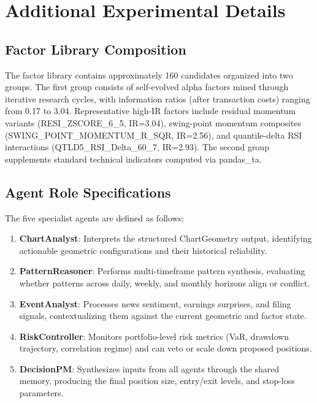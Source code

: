 \section{Additional Experimental Details}
\label{sec:appendix_details}

\subsection{Factor Library Composition}

The factor library contains approximately 160 candidates organized into two groups. The first group consists of self-evolved alpha factors mined through iterative research cycles, with information ratios (after transaction costs) ranging from 0.17 to 3.04. Representative high-IR factors include residual momentum variants (RESI\_ZSCORE\_6\_5, IR=3.04), swing-point momentum composites (SWING\_POINT\_MOMENTUM\_R\_SQR, IR=2.56), and quantile-delta RSI interactions (QTLD5\_RSI\_Delta\_60\_7, IR=2.93). The second group supplements standard technical indicators computed via pandas\_ta.

\subsection{Agent Role Specifications}

The five specialist agents are defined as follows:
\begin{enumerate}
    \item \textbf{ChartAnalyst}: Interprets the structured ChartGeometry output, identifying actionable geometric configurations and their historical reliability.
    \item \textbf{PatternReasoner}: Performs multi-timeframe pattern synthesis, evaluating whether patterns across daily, weekly, and monthly horizons align or conflict.
    \item \textbf{EventAnalyst}: Processes news sentiment, earnings surprises, and filing signals, contextualizing them against the current geometric and factor state.
    \item \textbf{RiskController}: Monitors portfolio-level risk metrics (VaR, drawdown trajectory, correlation regime) and can veto or scale down proposed positions.
    \item \textbf{DecisionPM}: Synthesizes inputs from all agents through the shared memory, producing the final position size, entry/exit levels, and stop-loss parameters.
\end{enumerate}

